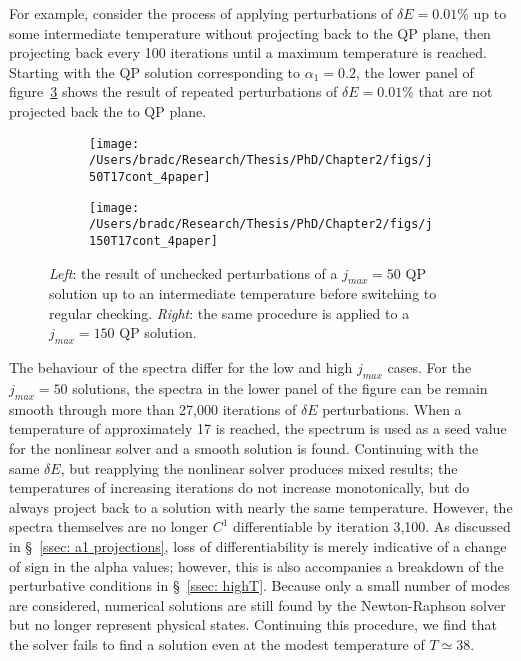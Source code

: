 \documentclass[../PhD.tex]{subfiles}
\begin{document}
\begin{subappendices}
For example, consider the process of applying perturbations of $\delta E = 0.01\%$ up to some intermediate temperature without projecting back to the QP plane, then projecting back every 100 iterations until a maximum temperature is reached. Starting with the QP solution corresponding to $\alpha_1 = 0.2$, the lower panel of figure~\ref{fig: reop check} shows the result of repeated perturbations of $\delta E = 0.01\%$ that are not projected back the to QP plane.

\begin{figure}[h!]
	\centering
	\begin{subfigure}[t]{0.48\textwidth}
		\texttt{[image: /Users/bradc/Research/Thesis/PhD/Chapter2/figs/j50T17cont\_4paper]}
		\label{fig: reop check j50}
	\end{subfigure}
	\;
	\begin{subfigure}[t]{0.48\textwidth}
		\texttt{[image: /Users/bradc/Research/Thesis/PhD/Chapter2/figs/j150T17cont\_4paper]}
		\label{fig: reop check j150}
	\end{subfigure}
\caption[Comparison of spectra and temperatures for different projection frequencies between $j_{max}=50$ and $j_{max} = 150$ solutions]{{\it Left}: the result of unchecked perturbations of a $j_{max} = 50$ QP solution up to an intermediate temperature before switching to regular checking. {\it Right}: the same procedure is applied to a $j_{max}=150$ QP solution.}
\label{fig: reop check}
\end{figure}

The behaviour of the spectra differ for the low and high $j_{max}$ cases. For the $j_{max}=50$ solutions, the spectra in the lower panel of the figure can be remain smooth through more than 27,000 iterations of $\delta E$ perturbations. When a temperature of approximately 17 is reached, the spectrum is used as a seed value for the nonlinear solver and a smooth solution is found. Continuing with the same $\delta E$, but reapplying the nonlinear solver produces mixed results; the temperatures of increasing iterations do not increase monotonically, but do always project back to a solution with nearly the same temperature. However, the spectra themselves are no longer $C^1$ differentiable by iteration 3,100. As discussed in \S~\!\ref{ssec: a1 projections}, loss of differentiability is merely indicative of a change of sign in the alpha values; however, this is also accompanies a breakdown of the perturbative conditions in \S\!~\ref{ssec: highT}. Because only a small number of modes are considered, numerical solutions are still found by the Newton-Raphson solver but no longer represent physical states. Continuing this procedure, we find that the solver fails to find a solution even at the modest temperature of $T \simeq 38$.


\end{subappendices}
\end{document}
